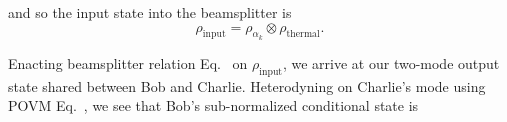 \noindent and so the input state into the beamsplitter is
\begin{equation}
\rho_{\text{input}} = \rho_{\alpha_k} \otimes \rho_{\text{thermal}}.
\end{equation}

\noindent Enacting beamsplitter relation Eq.~ on $\rho_{\text{input}}$, we arrive at our two-mode output state shared between Bob and Charlie.
Heterodyning on Charlie's mode using POVM Eq.~, we see that Bob's sub-normalized conditional state is


